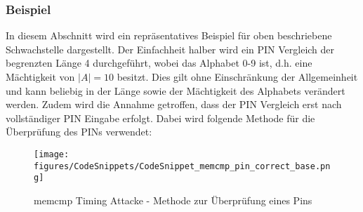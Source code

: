 \documentclass[a4paper,
DIV=13,
12pt,
BCOR=10mm,
department=FakIM,
oneside,
parskip=half,
automark,
listof=totocnumbered,
bibliography=totocnumbered,
acronym=totocnumbered
] {OTHRartcl}
\begin{document}
\subsubsection{Beispiel}
In diesem Abschnitt wird ein repräsentatives Beispiel für oben beschriebene Schwachstelle dargestellt.
Der Einfachheit halber wird ein PIN Vergleich der begrenzten Länge 4 durchgeführt, wobei das Alphabet 0-9 ist, d.h. eine Mächtigkeit von $|A| = 10$ besitzt.
Dies gilt ohne Einschränkung der Allgemeinheit und kann beliebig in der Länge sowie der Mächtigkeit des Alphabets verändert werden.
Zudem wird die Annahme getroffen, dass der PIN Vergleich erst nach vollständiger PIN Eingabe erfolgt. Dabei
wird folgende Methode für die Überprüfung des PINs verwendet:
\begin{figure}[ht!]
  \begin{center}
    \texttt{[image: figures/CodeSnippets/CodeSnippet\_memcmp\_pin\_correct\_base.png]}
    \caption{memcmp Timing Attacke - Methode zur Überprüfung eines Pins}
    \label{fig:memcmpcheckpinbase}
  \end{center}
\end{figure}
\end{document}
